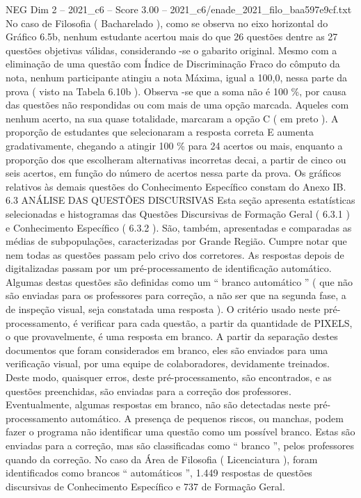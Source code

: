 \begin{textsample}{NEG Dim 2 – 2021\_c6 – Score 3.00 – 2021\_c6/enade\_2021\_filo\_baa597e9cf.txt}
No caso de Filosofia ( Bacharelado ), como se observa no eixo horizontal do Gráfico 6.5b, nenhum estudante acertou mais do que 26 questões dentre as 27 questões objetivas válidas, considerando -se o gabarito original.
Mesmo com a eliminação de uma questão com Índice de Discriminação Fraco do cômputo da nota, nenhum participante atingiu a nota Máxima, igual a 100,0, nessa parte da prova ( visto na Tabela 6.10b ).
Observa -se que a soma não é 100 \%, por causa das questões não respondidas ou com mais de uma opção marcada.
Aqueles com nenhum acerto, na sua quase totalidade, marcaram a opção C ( em preto ).
A proporção de estudantes que selecionaram a resposta correta E aumenta gradativamente, chegando a atingir 100 \% para 24 acertos ou mais, enquanto a proporção dos que escolheram alternativas incorretas decai, a partir de cinco ou seis acertos, em função do número de acertos nessa parte da prova.
Os gráficos relativos às demais questões do Conhecimento Específico constam do Anexo IB. 6.3 ANÁLISE DAS QUESTÕES DISCURSIVAS Esta seção apresenta estatísticas selecionadas e histogramas das Questões Discursivas de Formação Geral ( 6.3.1 ) e Conhecimento Específico ( 6.3.2 ).
São, também, apresentadas e comparadas as médias de subpopulações, caracterizadas por Grande Região.
Cumpre notar que nem todas as questões passam pelo crivo dos corretores.
As respostas depois de digitalizadas passam por um pré-processamento de identificação automático.
Algumas destas questões são definidas como um “ branco automático ” ( que não são enviadas para os professores para correção, a não ser que na segunda fase, a de inspeção visual, seja constatada uma resposta ).
O critério usado neste pré-processamento, é verificar para cada questão, a partir da quantidade de PIXELS, o que provavelmente, é uma resposta em branco.
A partir da separação destes documentos que foram considerados em branco, eles são enviados para uma verificação visual, por uma equipe de colaboradores, devidamente treinados.
Deste modo, quaisquer erros, deste pré-processamento, são encontrados, e as questões preenchidas, são enviadas para a correção dos professores.
Eventualmente, algumas respostas em branco, não são detectadas neste pré-processamento automático.
A presença de pequenos riscos, ou manchas, podem fazer o programa não identificar uma questão como um possível branco.
Estas são enviadas para a correção, mas são classificadas como “ branco ”, pelos professores quando da correção.
No caso da Área de Filosofia ( Licenciatura ), foram identificados como brancos “ automáticos ”, 1.449 respostas de questões discursivas de Conhecimento Específico e 737 de Formação Geral.

\end{textsample}
